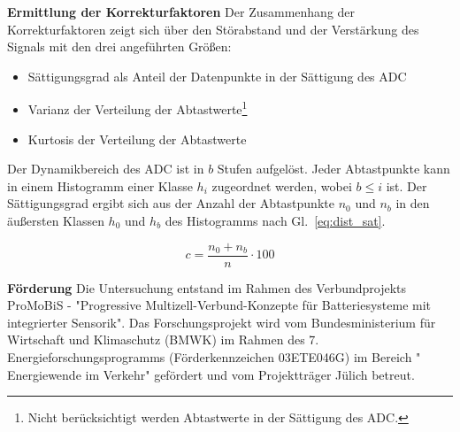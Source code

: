 \begin{multicols}{2}
\begin{mdboxshad}
			
				{\textbf{Ermittlung der Korrekturfaktoren} Der Zusammenhang der Korrekturfaktoren zeigt sich über den Störabstand und der Verstärkung des Signals mit den drei angeführten Größen: 
					\begin{itemize}
						\item Sättigungsgrad als Anteil der Datenpunkte in der Sättigung des ADC
						\item Varianz der Verteilung der Abtastwerte\footnote[1]{Nicht berücksichtigt werden Abtastwerte in der Sättigung des ADC.\label{foot:bereinigt}}
						\item Kurtosis der Verteilung der Abtastwerte
					\end{itemize}
					Der Dynamikbereich des ADC ist in $b$ Stufen aufgelöst. Jeder Abtastpunkte kann in einem Histogramm einer Klasse $h_i$ zugeordnet werden, wobei $b \leq i$ ist. Der Sättigungsgrad ergibt sich aus der Anzahl der Abtastpunkte $n_0$ und $n_b$ in den äußersten Klassen $h_0$ und $h_b$ des Histogramms nach Gl.~\eqref{eq:dist_sat}.
					
					\begin{equation}
						\label{eq:dist_sat}
						c = \frac{n_0 + n_b}{n} \cdot 100
					\end{equation}
				}
				
			\end{mdboxshad} 
			\vspace{10mm}
			\begin{mdboxshad}
				
			\end{mdboxshad}  
			\columnbreak  
			\begin{mdboxshad}
			
			\end{mdboxshad} 
\vspace{10mm}
			\begin{mdboxshad}
			
			

			\vspace{-10mm}
			\end{mdboxshad} 
\vspace{10mm}
			\begin{mdboxshad}
				
			\end{mdboxshad} 
			\vfill
			\begin{mdboxshad}
				\textbf{Förderung} Die Untersuchung entstand im Rahmen des Verbundprojekts 				ProMoBiS - "Progressive Multizell-Verbund-Konzepte für Batteriesysteme mit integrierter
				Sensorik". Das Forschungsprojekt wird vom Bundesministerium für Wirtschaft
				und Klimaschutz (BMWK) im Rahmen des 7. Energieforschungsprogramms (Förderkennzeichen
				03ETE046G) im Bereich " Energiewende im Verkehr" gefördert und vom Projektträger Jülich
				betreut.
			\end{mdboxshad} 
		\end{multicols}
		
